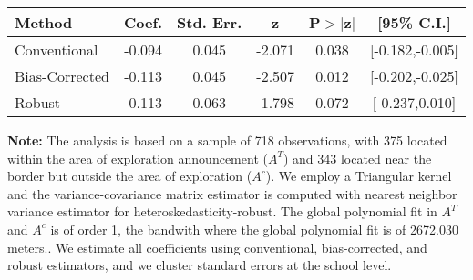 \begin{table}[htbp]\centering
 \footnotesize 
\begin{tabular}{lccccc}
\hline\hline
Method & Coef. & Std. Err. & z & P$>|$z$|$ & [95\% C.I.] \\ 
\hline \hline  
Conventional & -0.094 & 0.045 & -2.071 & 0.038 & [-0.182,-0.005] \\ 
 Bias-Corrected & -0.113 & 0.045 & -2.507 & 0.012 & [-0.202,-0.025] \\ 
Robust & -0.113 & 0.063 & -1.798 & 0.072 & [-0.237,0.010] \\ 
  \hline\hline
\end{tabular}
\label{table:rd}
\begin{tablenotes} 
  \justifying \tiny \textbf{Note: }    
   The analysis is based on a sample of 718 observations, with 375 located within the area of exploration announcement ($A^{T}$) and 343 located near the border but outside the area of exploration  ($A^{c}$). 
           We employ a Triangular kernel and the variance-covariance matrix estimator is computed with nearest neighbor variance estimator for heteroskedasticity-robust. The global polynomial fit in  $A^{T}$ and $A^{c}$ is of order 1, the bandwith where the global polynomial fit is of 2672.030 meters.. We estimate all coefficients using conventional, bias-corrected, and robust estimators, and we cluster standard errors at the school level. \end{tablenotes} 
 \end{table} 
